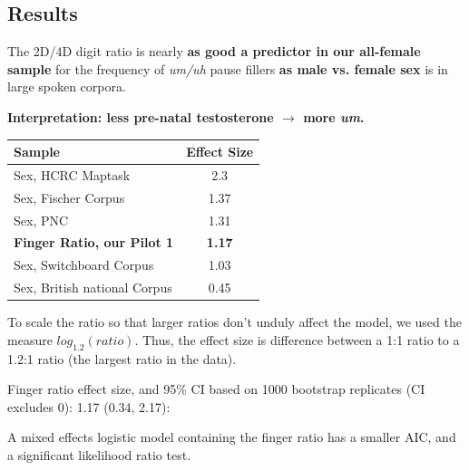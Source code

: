 \documentclass[a0,portrait]{a0poster}
\begin{document}
\begin{multicols}{2}

\section*{Results}



The 2D/4D digit ratio is nearly \textbf{as good a predictor in our all-female sample} for the frequency of \textsl{um/uh} pause fillers  \textbf{as male vs. female sex} is in large spoken corpora.
\begin{center}
\noindent\textbf{Interpretation: less pre-natal testosterone $\rightarrow$ more \textsl{um}.}
\end{center}
\begin{table} %
\begin{tabular}{l c}
\toprule
\textbf{Sample} & \textbf{Effect Size}\\
\midrule
Sex, HCRC Maptask & 2.3\\
Sex, Fischer Corpus & 1.37\\
Sex, PNC & 1.31\\
\textbf{Finger Ratio, our Pilot 1} & \textbf{1.17}\\
Sex, Switchboard Corpus & 1.03\\
Sex, British national Corpus & 0.45\\
\bottomrule
\end{tabular}
\end{table}

To scale the ratio so that larger ratios don't unduly affect the model, we used the measure $log_1.2(ratio)$. Thus, the effect size is difference between a 1:1 ratio to a 1.2:1 ratio (the largest ratio in the data).

Finger ratio effect size, and 95\% CI based on 1000 bootstrap replicates (CI excludes 0): 1.17 (0.34, 2.17):

A mixed effects logistic model containing the finger ratio has a smaller AIC, and a significant likelihood ratio test.


\end{multicols}
\end{document}
